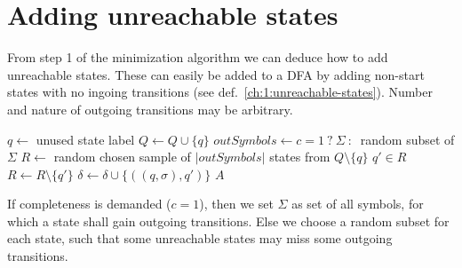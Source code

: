 \section{Adding unreachable states}

From step 1 of the minimization algorithm we can deduce how to add unreachable states. These can easily be added to a DFA by adding non-start states with no ingoing transitions (see def.~\ref{ch:1:unreachable-states}). Number and nature of outgoing transitions may be arbitrary.

\vspace{0.2cm}
\begin{algorithmic}[1]
		\State $q \gets$ unused state label
		\State $Q \gets Q \cup \{ q \}$
        \State $outSymbols \gets c = 1\ ?\ \Sigma\ :\ $ random subset of $\Sigma$
		\State $R \gets$ random chosen sample of $|outSymbols|$ states from $Q \setminus \{q\}$
			\State $q' \in R$
			\State $R \gets R \setminus \{q'\}$
			\State $\delta \gets \delta \cup \{ ((q, \sigma), q') \}$
		\EndFor
	\EndFor
	\State \Return $A$
	\EndFunction
\end{algorithmic}
\vspace{0.2cm}
If completeness is demanded ($c=1$), then we set $\Sigma$ as set of all symbols, for which a state shall gain outgoing transitions. Else we choose a random subset for each state, such that some unreachable states may miss some outgoing transitions.
